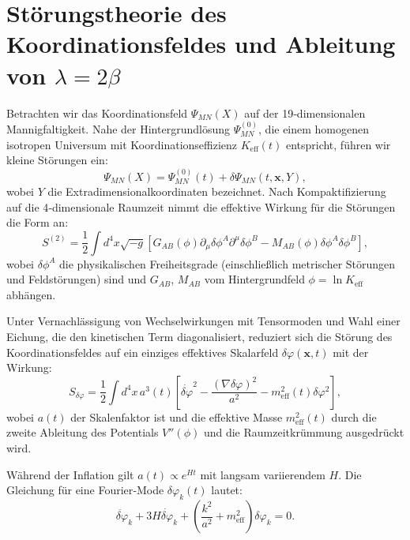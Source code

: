 \documentclass[12pt]{article}
\theoremstyle{remark}
\newcommand{\Keff}{K_{\mathrm{eff}}}
\begin{document}
	\appendix
	\section{Störungstheorie des Koordinationsfeldes und Ableitung von $\lambda = 2\beta$}
	\label{app:perturbations}
	
	Betrachten wir das Koordinationsfeld $\Psi_{MN}(X)$ auf der 19‑dimensionalen Mannigfaltigkeit. Nahe der Hintergrundlösung $\Psi^{(0)}_{MN}$, die einem homogenen isotropen Universum mit Koordinationseffizienz $\Keff(t)$ entspricht, führen wir kleine Störungen ein:
	\begin{equation}
		\Psi_{MN}(X) = \Psi^{(0)}_{MN}(t) + \delta\Psi_{MN}(t,\mathbf{x},Y),
	\end{equation}
	wobei $Y$ die Extradimensionalkoordinaten bezeichnet. Nach Kompaktifizierung auf die 4‑dimensionale Raumzeit nimmt die effektive Wirkung für die Störungen die Form an:
	\begin{equation}
		S^{(2)} = \frac{1}{2} \int d^4x \sqrt{-g} \left[ G_{AB}(\phi) \partial_\mu \delta\phi^A \partial^\mu \delta\phi^B - M_{AB}(\phi) \delta\phi^A \delta\phi^B \right],
	\end{equation}
	wobei $\delta\phi^A$ die physikalischen Freiheitsgrade (einschließlich metrischer Störungen und Feldstörungen) sind und $G_{AB}$, $M_{AB}$ vom Hintergrundfeld $\phi = \ln\Keff$ abhängen.
	
	Unter Vernachlässigung von Wechselwirkungen mit Tensormoden und Wahl einer Eichung, die den kinetischen Term diagonalisiert, reduziert sich die Störung des Koordinationsfeldes auf ein einziges effektives Skalarfeld $\delta\varphi(\mathbf{x},t)$ mit der Wirkung:
	\begin{equation}
		S_{\delta\varphi} = \frac{1}{2} \int d^4x \, a^3(t) \left[ \dot{\delta\varphi}^2 - \frac{(\nabla\delta\varphi)^2}{a^2} - m_{\mathrm{eff}}^2(t) \delta\varphi^2 \right],
	\end{equation}
	wobei $a(t)$ der Skalenfaktor ist und die effektive Masse $m_{\mathrm{eff}}^2(t)$ durch die zweite Ableitung des Potentials $V''(\phi)$ und die Raumzeitkrümmung ausgedrückt wird.
	
	Während der Inflation gilt $a(t) \propto e^{Ht}$ mit langsam variierendem $H$. Die Gleichung für eine Fourier‑Mode $\delta\varphi_k(t)$ lautet:
	\begin{equation}
		\ddot{\delta\varphi}_k + 3H\dot{\delta\varphi}_k + \left( \frac{k^2}{a^2} + m_{\mathrm{eff}}^2 \right) \delta\varphi_k = 0.
	\end{equation}
	
\end{document}
